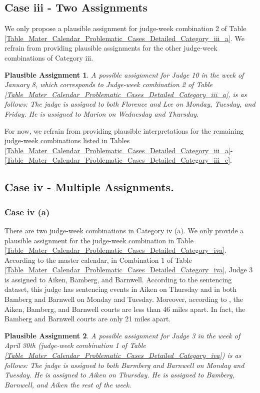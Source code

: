 \documentclass[11pt, oneside]{article}   	%
\theoremstyle{ModifiedStyle}
\newtheorem{plausible_assignment}{Plausible Assignment}
\begin{document}
\subsection{Case iii - Two Assignments}
%
We only propose a plausible assignment for judge-week combination 2 of Table \ref{Table_Mater_Calendar_Problematic_Cases_Detailed_Category_iii_a}. We refrain from providing plausible assignments for the other judge-week combinations of Category iii.
%
\begin{plausible_assignment}
	A possible assignment for Judge 10 in the week of January 8, which corresponds to Judge-week combination 2 of Table \ref{Table_Mater_Calendar_Problematic_Cases_Detailed_Category_iii_a}, is as follows: The judge is assigned to both Florence and Lee on Monday, Tuesday, and Friday. He is assigned to Marion on Wednesday and Thursday.
\end{plausible_assignment}
For now, we refrain from providing plausible interpretations for the remaining judge-week combinations listed in Tables \ref{Table_Mater_Calendar_Problematic_Cases_Detailed_Category_iii_a}-\ref{Table_Mater_Calendar_Problematic_Cases_Detailed_Category_iii_c}.
%
\subsection{Case iv - Multiple Assignments.}
%
\subsubsection{Case iv (a)}
%
There are two judge-week combinations in Category iv (a). We only provide a plausible assignment for the judge-week combination in Table \ref{Table_Mater_Calendar_Problematic_Cases_Detailed_Category_iva}. According to the master calendar, in Combination 1 of Table \ref{Table_Mater_Calendar_Problematic_Cases_Detailed_Category_iva}, Judge 3 is assigned to Aiken, Bamberg, and Barnwell. According to the sentencing dataset, this judge has sentencing events in Aiken on Thursday and in both Bamberg and Barnwell on Monday and Tuesday. Moreover, according to \citet{SCCourts}, the Aiken, Bamberg, and Barnwell courts are less than 46 miles apart. In fact, the Bamberg and Barnwell courts are only 21 miles apart.
%
\begin{plausible_assignment}
	A possible assignment for Judge 3 in the week of April 30th (judge-week combination 1 of Table \ref{Table_Mater_Calendar_Problematic_Cases_Detailed_Category_iva}) is as follows: The judge is assigned to both Barmberg and Barnwell on Monday and Tuesday. He is assigned to Aiken on Thursday. He is assigned to Bamberg, Barnwell, and Aiken the rest of the week.
\end{plausible_assignment}
%
\end{document}
